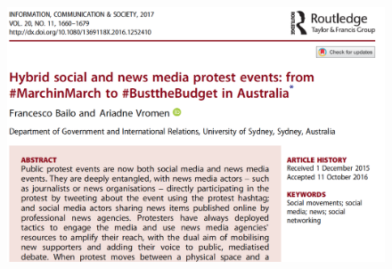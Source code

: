 \documentclass[serif, aspectratio=169]{beamer}
\begin{document}
\begin{frame}

\begin{columns}

\begin{column}{0.6\textwidth}
\begin{figure}
    \includegraphics{figure/paper_bailo}
\end{figure}
\end{column}


\end{columns}
\end{frame}
\end{document}
